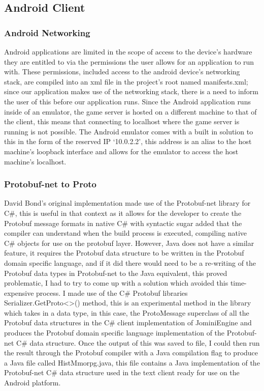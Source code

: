 \documentclass{article}
\begin{document}
\subsection{Android Client }

\subsubsection{Android Networking}

Android applications are limited in the scope of access to the device’s hardware they are entitled to via the permissions the user allows for an application to run with. These permissions, included access to the android device’s networking stack, are compiled into an xml file in the project’s root named manifests.xml; since our application makes use of the networking stack, there is a need to inform the user of this before our application runs. Since the Android application runs inside of an emulator, the game server is hosted on a different machine to that of the client, this means that connecting to localhost where the game server is running is not possible. The Android emulator comes with a built in solution to this in the form of the reserved IP ‘10.0.2.2’, this address is an alias to the host machine’s loopback interface and allows for the emulator to access the host machine’s localhost.

\subsubsection{Protobuf-net to Proto}

David Bond’s original implementation made use of the Protobuf-net library for C\#, this is useful in that context as it allows for the developer to create the Protobuf message formats in native C\# with syntactic sugar added that the compiler can understand when the build process is executed, compiling native C\# objects for use on the protobuf layer. However, Java does not have a similar feature, it requires the Protobuf data structure to be written in the Protobuf domain specific language, and if it did there would need to be a re-writing of the Protobuf data types in Protobuf-net to the Java equivalent, this proved problematic, I had to try to come up with a solution which avoided this time-expensive process. I made use of the C\# Protobuf libraries Serializer.GetProto<>() method, this is an experimental method in the library which takes in a data type, in this case, the ProtoMessage superclass of all the Protobuf data structures in the C\# client implementation of JominiEngine and produces the Protobuf domain specific language implementation of the Protobuf-net C\# data structure. Once the output of this was saved to file, I could then run the result through the Protobuf compiler with a Java compilation flag to produce a Java file called HistMmorpg.java, this file contains a Java implementation of the Protobuf-net C\# data structure used in the text client ready for use on the Android platform.
\end{document}
